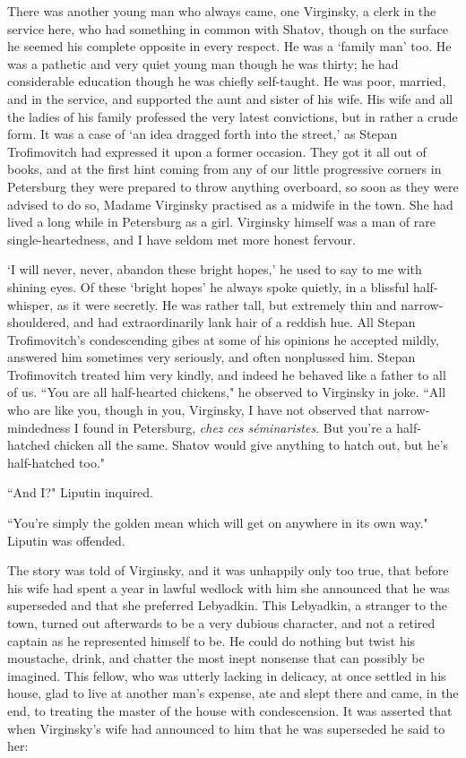 \documentclass[12pt]{article}
\begin{document}
\vspace{12pt}
There was another young man who always came, one Virginsky, a clerk in
the service here, who had something in common with Shatov, though on
the surface he seemed his complete opposite in every respect. He was a
`family man' too. He was a pathetic and very quiet young man though
he was thirty; he had considerable education though he was chiefly
self-taught. He was poor, married, and in the service, and supported the
aunt and sister of his wife. His wife and all the ladies of his family
professed the very latest convictions, but in rather a crude form.
It was a case of `an idea dragged forth into the street,' as Stepan
Trofimovitch had expressed it upon a former occasion. They got it
all out of books, and at the first hint coming from any of our little
progressive corners in Petersburg they were prepared to throw anything
overboard, so soon as they were advised to do so, Madame Virginsky
practised as a midwife in the town. She had lived a long while
in Petersburg as a girl. Virginsky himself was a man of rare
single-heartedness, and I have seldom met more honest fervour.


\vspace{12pt}
`I will never, never, abandon these bright hopes,' he used to say to me
with shining eyes. Of these `bright hopes' he always spoke quietly, in
a blissful half-whisper, as it were secretly. He was rather tall, but
extremely thin and narrow-shouldered, and had extraordinarily lank hair
of a reddish hue. All Stepan Trofimovitch's condescending gibes at
some of his opinions he accepted mildly, answered him sometimes very
seriously, and often nonplussed him. Stepan Trofimovitch treated him
very kindly, and indeed he behaved like a father to all of us. ``You are
all half-hearted chickens," he observed to Virginsky in joke. ``All
who are like you, though in you, Virginsky, I have not observed that
narrow-mindedness I found in Petersburg, \emph{chez ces séminaristes}. But
you're a half-hatched chicken all the same. Shatov would give anything
to hatch out, but he's half-hatched too."


\vspace{12pt}
``And I?" Liputin inquired.


\vspace{12pt}
``You're simply the golden mean which will get on anywhere in its own
way." Liputin was offended.


\vspace{12pt}
The story was told of Virginsky, and it was unhappily only too true,
that before his wife had spent a year in lawful wedlock with him she
announced that he was superseded and that she preferred Lebyadkin. This
Lebyadkin, a stranger to the town, turned out afterwards to be a very
dubious character, and not a retired captain as he represented himself
to be. He could do nothing but twist his moustache, drink, and chatter
the most inept nonsense that can possibly be imagined. This fellow, who
was utterly lacking in delicacy, at once settled in his house, glad to
live at another man's expense, ate and slept there and came, in the end,
to treating the master of the house with condescension. It was asserted
that when Virginsky's wife had announced to him that he was superseded
he said to her:
\end{document}
